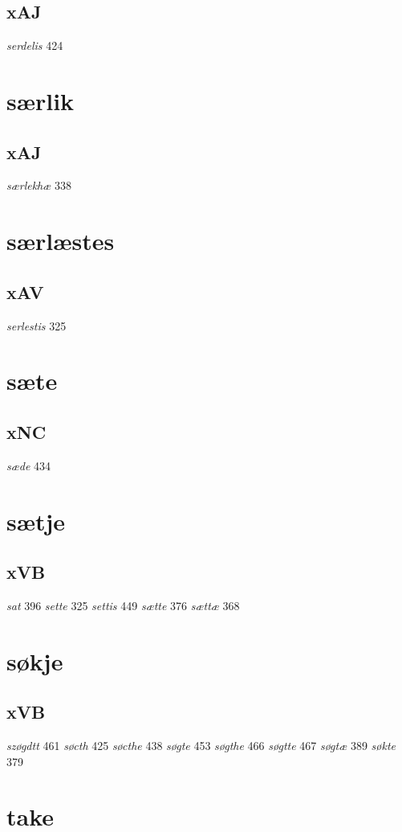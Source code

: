 \documentclass[a4paper,twocolumn]{article}
\begin{document}
\subsection{xAJ}
\label{sec:org24e3165}
\emph{serdelis} 424 
\section{særlik}
\label{sec:org393c1ee}
\subsection{xAJ}
\label{sec:orgbee482f}
\emph{særlekhæ} 338 
\section{særlæstes}
\label{sec:org8361c25}
\subsection{xAV}
\label{sec:orgd724da0}
\emph{serlestis} 325 
\section{sæte}
\label{sec:org4df3cac}
\subsection{xNC}
\label{sec:org2c29f10}
\emph{sæde} 434 
\section{sætje}
\label{sec:org036de81}
\subsection{xVB}
\label{sec:orgfc7cf72}
\emph{sat} 396 \emph{sette} 325 \emph{settis} 449 \emph{sætte} 376 \emph{sættæ} 368 
\section{søkje}
\label{sec:org53ac74d}
\subsection{xVB}
\label{sec:orga73e852}
\emph{szøgdtt} 461 \emph{søcth} 425 \emph{søcthe} 438 \emph{søgte} 453 \emph{søgthe} 466 \emph{søgtte} 467 \emph{søgtæ} 389 \emph{søkte} 379 
\section{take}
\label{sec:org1054f17}
\end{document}

